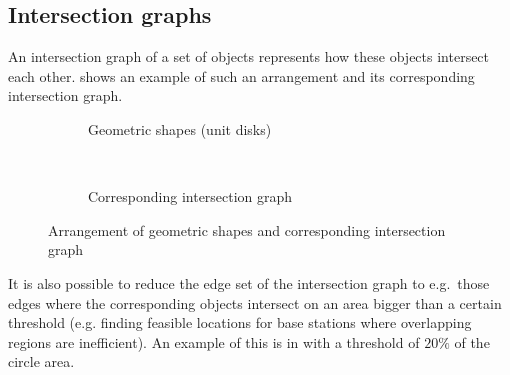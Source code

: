 \subsection{Intersection graphs}\label{sec:ig}
An intersection graph of a set of objects represents how these objects intersect each other.  shows an example of such an arrangement and its corresponding intersection graph.
  \begin{figure*}[!h]
    \centering
    \begin{subfigure}[t]{0.5\textwidth}
        \centering

      \caption{Geometric shapes (unit disks)}
\end{subfigure}%
  ~ 
 \begin{subfigure}[t]{0.5\textwidth}
      \centering
        \caption{Corresponding intersection graph}
    \end{subfigure}
    \caption{Arrangement of geometric shapes and corresponding intersection graph}\label{fig:igex}
\end{figure*}

It is also possible to reduce the edge set of the intersection graph to e.g.\ those edges where the corresponding objects intersect on an area bigger than a certain threshold (e.g. finding feasible locations for base stations where overlapping regions are inefficient). An example of this is in  with a threshold of $20\%$ of the circle area.
\begin{figure}\centering


\end{figure}

